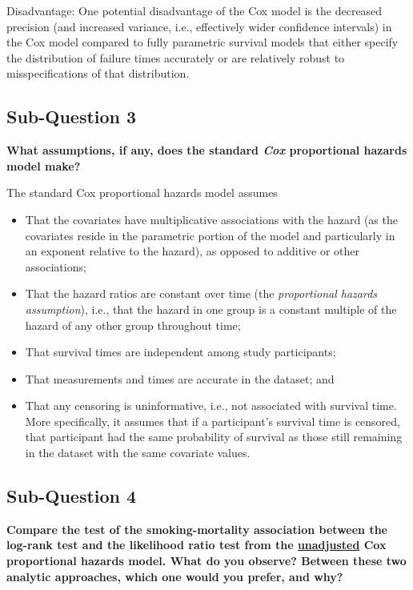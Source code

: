 \documentclass{article}\usepackage[]{graphicx}\usepackage[]{color}
\begin{document}
\vspace{2mm}

Disadvantage:
One potential disadvantage of the Cox model is the decreased precision (and increased variance, i.e., effectively wider confidence intervals) in the Cox model compared to fully parametric survival models that either specify the distribution of failure times accurately or are relatively robust to misspecifications of that distribution.

\vspace{2mm}

\subsection*{Sub-Question 3}
\textbf{What assumptions, if any, does the standard \textit{Cox} proportional hazards model make?}

\vspace{2mm}

The standard Cox proportional hazards model assumes

\begin{itemize}
  \item That the covariates have multiplicative associations with the hazard (as the covariates reside in the parametric portion of the model and particularly in an exponent relative to the hazard), as opposed to additive or other associations;
  \item That the hazard ratios are constant over time (the \textit{proportional hazards assumption}), i.e., that the hazard in one group is a constant multiple of the hazard of any other group throughout time;
  \item That survival times are independent among study participants; 
  \item That measurements and times are accurate in the dataset; and
  \item That any censoring is uninformative, i.e., not associated with survival time.  More specifically, it assumes that if a participant's survival time is censored, that participant had the same probability of survival as those still remaining in the dataset with the same covariate values.
  
\end{itemize}

\vspace{2mm}

\subsection*{Sub-Question 4}
\textbf{Compare the test of the smoking-mortality association between the log-rank test and the likelihood ratio test from the \ul{unadjusted} Cox proportional hazards model. What do you observe? Between these two analytic approaches, which one would you prefer, and why?}
\end{document}
